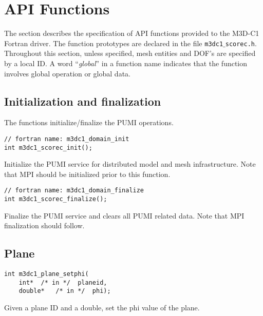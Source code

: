 \section{API Functions}
The section describes the specification of API functions provided to the M3D-C1 Fortran driver. The function prototypes are declared in the file \texttt{m3dc1$\_$scorec.h}. Throughout this section, unless specified, mesh entities and DOF's are specified by a local ID. A word ``\emph{global}'' in a function name indicates that the function involves global operation or global data.

\subsection{Initialization and finalization}
The functions initialize/finalize the PUMI operations.

\begin{verbatim}
// fortran name: m3dc1_domain_init
int m3dc1_scorec_init();
\end{verbatim}\vspace{-.5cm}\hspace{1cm}
Initialize the PUMI service for distributed model and mesh infrastructure. Note that MPI should be initialized prior to this function.

\begin{verbatim}
// fortran name: m3dc1_domain_finalize
int m3dc1_scorec_finalize();
\end{verbatim}\vspace{-.5cm}\hspace{1cm}
Finalize the PUMI service and clears all PUMI related data. Note that MPI finalization should follow.

\subsection{Plane}

\begin{verbatim}
int m3dc1_plane_setphi(
    int*  /* in */  planeid, 
    double*   /* in */  phi);
\end{verbatim}\vspace{-.5cm}\hspace{1cm}
Given a plane ID and a double, set the phi value of the plane.


